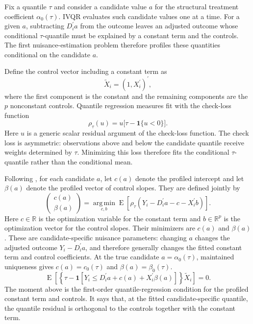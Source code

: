 Fix a quantile $\tau$ and consider a candidate value $a$ for the structural treatment coefficient $\alpha_0(\tau)$. IVQR evaluates such candidate values one at a time. For a given $a$, subtracting $D_i^{\prime}a$ from the outcome leaves an adjusted outcome whose conditional $\tau$-quantile must be explained by a constant term and the controls. The first nuisance-estimation problem therefore profiles these quantities conditional on the candidate $a$.

Define the control vector including a constant term as
\[
    \widetilde X_i=(1,X_i^{\prime})^{\prime},
\]
where the first component is the constant and the remaining components are the $p$ nonconstant controls. Quantile regression measures fit with the check-loss function
\begin{equation}
    \rho_{\tau}(u)
    = u\bigl[\tau-\mathbf{1}\{u<0\}\bigr].
    \label{eq:check-loss}
\end{equation}
Here $u$ is a generic scalar residual argument of the check-loss function. The check loss is asymmetric: observations above and below the candidate quantile receive weights determined by $\tau$. Minimizing this loss therefore fits the conditional $\tau$-quantile rather than the conditional mean.

Following \textcite{chen_huang_tien_2021}, for each candidate $a$, let $c(a)$ denote the profiled intercept and let $\beta(a)$ denote the profiled vector of control slopes. They are defined jointly by
\begin{equation}
    \begin{pmatrix}
        c(a)\\
        \beta(a)
    \end{pmatrix}
    = \operatorname*{arg\,min}_{c,b}
      \operatorname{E}\!\left[
          \rho_{\tau}\!\left(Y_i-D_i^{\prime}a-c-X_i^{\prime}b\right)
      \right].
    \label{eq:profile-beta}
\end{equation}
Here $c\in\mathbb{R}$ is the optimization variable for the constant term and $b\in\mathbb{R}^{p}$ is the optimization vector for the control slopes. Their minimizers are $c(a)$ and $\beta(a)$. These are candidate-specific nuisance parameters: changing $a$ changes the adjusted outcome $Y_i-D_i^{\prime}a$, and therefore generally changes the fitted constant term and control coefficients. At the true candidate $a=\alpha_0(\tau)$, maintained uniqueness gives $c(a)=c_0(\tau)$ and $\beta(a)=\beta_0(\tau)$.
\begin{equation}
    \operatorname{E}\!\left[
        \left\{
            \tau-\mathbf{1}\!\left[
                Y_i\leq D_i^{\prime}a+c(a)+X_i^{\prime}\beta(a)
            \right]
        \right\}\widetilde X_i
    \right]
    =0.
    \label{eq:profile-beta-moment}
\end{equation}
The moment above is the first-order quantile-regression condition for the profiled constant term and controls. It says that, at the fitted candidate-specific quantile, the quantile residual is orthogonal to the controls together with the constant term.

